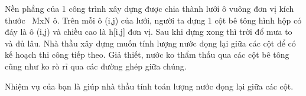 Nền phẳng của 1 công trình xây dựng được chia thành lưới ô vuông đơn vị kích thước  MxN ô. Trên mỗi ô (i,j) của lưới, người ta dựng 1 cột bê tông hình hộp có đáy là ô (i,j) và chiều cao là h[i,j] đơn vị. Sau khi dựng xong thì trời đổ mưa to và đủ lâu. Nhà thầu xây dựng muốn tính lượng nước đọng lại giữa các cột để có kế hoạch thi công tiếp theo. Giả thiết, nước ko thẩm thấu qua các cột bê tông cũng như ko rò rỉ qua các đường ghép giữa chúng.  

   Nhiệm vụ của bạn là giúp nhà thầu tính toán lượng nước đọng lại giữa các cột.  

\